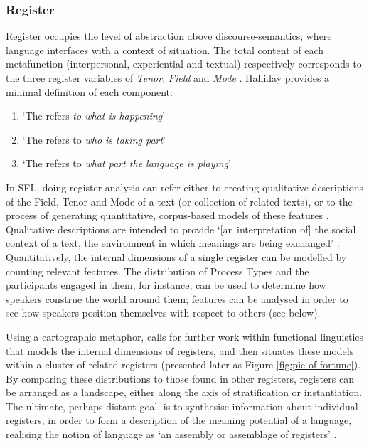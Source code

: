 \subsubsection{Register}

Register occupies the level of abstraction above \glspl{discourse-semantic}, where language interfaces with a context of situation. The total content of each metafunction (interpersonal, experiential and textual) respectively corresponds to the three register variables of \emph{Tenor}, \emph{Field} and \emph{Mode} \cite{halliday_language_1989}. Halliday provides a minimal definition of each component:

\begin{enumerate}
\item  `The  refers \emph{to what is happening}'
\item `The  refers to \emph{who is taking part}'
\item `The  refers to \emph{what part the language is playing}' \parencite*[p.~12]{halliday_language_1989}
\end{enumerate}
%
In \gls{SFL}, doing register analysis can refer either to creating qualitative descriptions of the Field, Tenor and \gls{Mode} of a text (or collection of related texts), or to the process of generating quantitative, corpus\hyp{}based models of these features \cite{lukin2011halliday,matthiessen_modeling_2015}. Qualitative descriptions are intended to provide `[an interpretation of] the social context of a text, the environment in which meanings are being exchanged' \cite[p.~12]{halliday_language_1989}. Quantitatively, the internal dimensions of a single register can be modelled by counting relevant  features. The distribution of Process Types and the participants engaged in them, for instance, can be used to determine how speakers construe the world around them;  features can be analysed in order to see how speakers position themselves with respect to others (see below). 

Using a cartographic metaphor, \textcite{matthiessen_modeling_2015,Matthiessen2015} calls for further work within functional linguistics that models the internal dimensions of registers, and then situates these models within a cluster of related registers (presented later as Figure \ref{fig:pie-of-fortune}). By comparing these distributions to those found in other registers, registers can be arranged as a landscape, either along the axis of stratification or instantiation. The ultimate, perhaps distant goal, is to synthesise information about individual registers, in order to form a description of the meaning potential of a language, realising the notion of language as `an assembly or assemblage of registers' \parencite*[p.~44]{matthiessen_modeling_2015}. 

